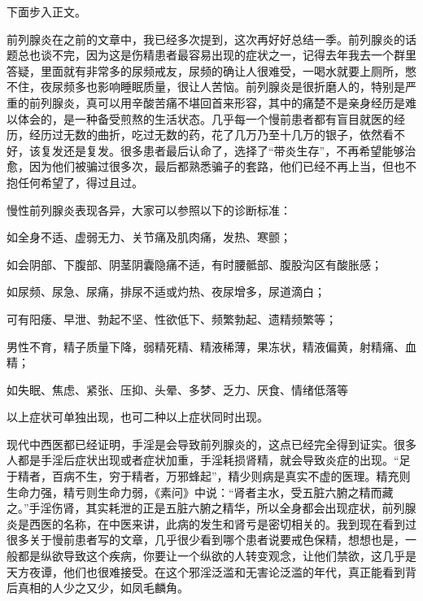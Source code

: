 下面步入正文。

前列腺炎在之前的文章中，我已经多次提到，这次再好好总结一季。前列腺炎的话题总也谈不完，因为这是伤精患者最容易出现的症状之一，记得去年我去一个群里答疑，里面就有非常多的尿频戒友，尿频的确让人很难受，一喝水就要上厕所，憋不住，夜尿频多也影响睡眠质量，很让人苦恼。前列腺炎是很折磨人的，特别是严重的前列腺炎，真可以用辛酸苦痛不堪回首来形容，其中的痛楚不是亲身经历是难以体会的，是一种备受煎熬的生活状态。几乎每一个慢前患者都有盲目就医的经历，经历过无数的曲折，吃过无数的药，花了几万乃至十几万的银子，依然看不好，该复发还是复发。很多患者最后认命了，选择了“带炎生存”，不再希望能够治愈，因为他们被骗过很多次，最后都熟悉骗子的套路，他们已经不再上当，但也不抱任何希望了，得过且过。

慢性前列腺炎表现各异，大家可以参照以下的诊断标准：

\begin{description}
    \item[全身症状] 如全身不适、虚弱无力、关节痛及肌肉痛，发热、寒颤；
    \item[疼痛症状] 如会阴部、下腹部、阴茎阴囊隐痛不适，有时腰骶部、腹股沟区有酸胀感；
    \item[排尿改变及尿道分泌物] 如尿频、尿急、尿痛，排尿不适或灼热、夜尿增多，尿道滴白；
    \item[性功能症状] 可有阳痿、早泄、勃起不坚、性欲低下、频繁勃起、遗精频繁等；
    \item 男性不育，精子质量下降，弱精死精、精液稀薄，果冻状，精液偏黄，射精痛、血精；
    \item[神经症状] 如失眠、焦虑、紧张、压抑、头晕、多梦、乏力、厌食、情绪低落等
    \item 以上症状可单独出现，也可二种以上症状同时出现。
\end{description}

现代中西医都已经证明，手淫是会导致前列腺炎的，这点已经完全得到证实。很多人都是手淫后症状出现或者症状加重，手淫耗损肾精，就会导致炎症的出现。“足于精者，百病不生，穷于精者，万邪蜂起”，精少则病是真实不虚的医理。精充则生命力强，精亏则生命力弱，《素问》中说：“肾者主水，受五脏六腑之精而藏之。”手淫伤肾，其实耗泄的正是五脏六腑之精华，所以全身都会出现症状，前列腺炎是西医的名称，在中医来讲，此病的发生和肾亏是密切相关的。我到现在看到过很多关于慢前患者写的文章，几乎很少看到哪个患者说要戒色保精，想想也是，一般都是纵欲导致这个疾病，你要让一个纵欲的人转变观念，让他们禁欲，这几乎是天方夜谭，他们也很难接受。在这个邪淫泛滥和无害论泛滥的年代，真正能看到背后真相的人少之又少，如凤毛麟角。


